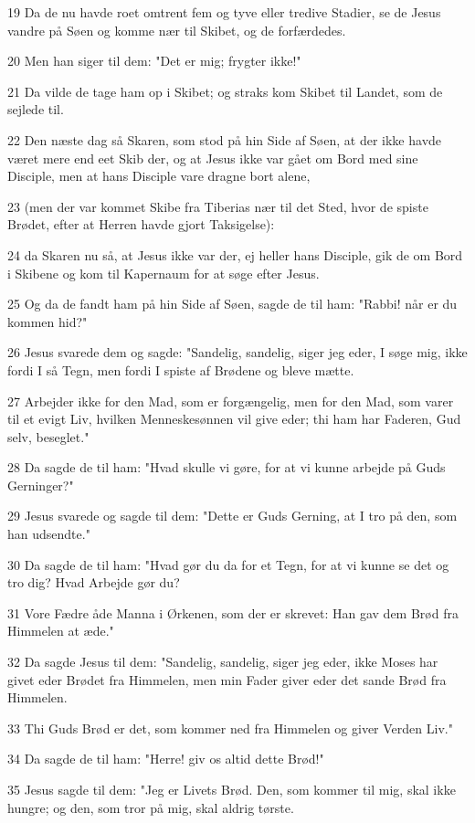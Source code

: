 \par 19 Da de nu havde roet omtrent fem og tyve eller tredive Stadier, se de Jesus vandre på Søen og komme nær til Skibet, og de forfærdedes.
\par 20 Men han siger til dem: "Det er mig; frygter ikke!"
\par 21 Da vilde de tage ham op i Skibet; og straks kom Skibet til Landet, som de sejlede til.
\par 22 Den næste dag så Skaren, som stod på hin Side af Søen, at der ikke havde været mere end eet Skib der, og at Jesus ikke var gået om Bord med sine Disciple, men at hans Disciple vare dragne bort alene,
\par 23 (men der var kommet Skibe fra Tiberias nær til det Sted, hvor de spiste Brødet, efter at Herren havde gjort Taksigelse):
\par 24 da Skaren nu så, at Jesus ikke var der, ej heller hans Disciple, gik de om Bord i Skibene og kom til Kapernaum for at søge efter Jesus.
\par 25 Og da de fandt ham på hin Side af Søen, sagde de til ham: "Rabbi! når er du kommen hid?"
\par 26 Jesus svarede dem og sagde: "Sandelig, sandelig, siger jeg eder, I søge mig, ikke fordi I så Tegn, men fordi I spiste af Brødene og bleve mætte.
\par 27 Arbejder ikke for den Mad, som er forgængelig, men for den Mad, som varer til et evigt Liv, hvilken Menneskesønnen vil give eder; thi ham har Faderen, Gud selv, beseglet."
\par 28 Da sagde de til ham: "Hvad skulle vi gøre, for at vi kunne arbejde på Guds Gerninger?"
\par 29 Jesus svarede og sagde til dem: "Dette er Guds Gerning, at I tro på den, som han udsendte."
\par 30 Da sagde de til ham: "Hvad gør du da for et Tegn, for at vi kunne se det og tro dig? Hvad Arbejde gør du?
\par 31 Vore Fædre åde Manna i Ørkenen, som der er skrevet: Han gav dem Brød fra Himmelen at æde."
\par 32 Da sagde Jesus til dem: "Sandelig, sandelig, siger jeg eder, ikke Moses har givet eder Brødet fra Himmelen, men min Fader giver eder det sande Brød fra Himmelen.
\par 33 Thi Guds Brød er det, som kommer ned fra Himmelen og giver Verden Liv."
\par 34 Da sagde de til ham: "Herre! giv os altid dette Brød!"
\par 35 Jesus sagde til dem: "Jeg er Livets Brød. Den, som kommer til mig, skal ikke hungre; og den, som tror på mig, skal aldrig tørste.
